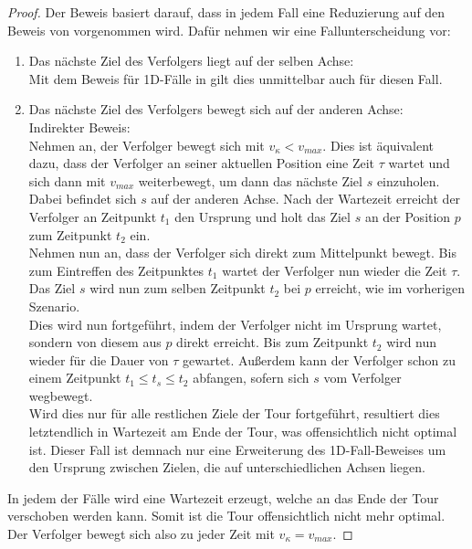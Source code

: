 \documentclass[german,version-2019-11]{uzl-thesis}
\begin{document}
\begin{proof}
Der Beweis basiert darauf, dass in jedem Fall eine Reduzierung auf den Beweis von \cite{helvig} vorgenommen wird. Dafür nehmen wir eine Fallunterscheidung vor:
\begin{enumerate}
\item Das nächste Ziel des Verfolgers liegt auf der selben Achse: \\
Mit dem Beweis für 1D-Fälle in \cite{helvig} gilt dies unmittelbar auch für diesen Fall.

\item Das nächste Ziel des Verfolgers bewegt sich auf der anderen Achse: \\
Indirekter Beweis: \\
Nehmen an, der Verfolger bewegt sich mit $v_{\kappa} < v_{max}$. Dies ist äquivalent dazu, dass der Verfolger an seiner aktuellen Position eine Zeit $\tau$ wartet und sich dann mit $v_{max}$ weiterbewegt, um dann das nächste Ziel $s$ einzuholen. Dabei befindet sich $s$ auf der anderen Achse. Nach der Wartezeit erreicht der Verfolger an Zeitpunkt $t_1$ den Ursprung und holt das Ziel $s$ an der Position $p$ zum Zeitpunkt $t_2$ ein. \\
Nehmen nun an, dass der Verfolger sich direkt zum Mittelpunkt bewegt. Bis zum Eintreffen des Zeitpunktes $t_1$ wartet der Verfolger nun wieder die Zeit $\tau$. Das Ziel $s$ wird nun zum selben Zeitpunkt $t_2$ bei $p$ erreicht, wie im vorherigen Szenario. \\
Dies wird nun fortgeführt, indem der Verfolger nicht im Ursprung wartet, sondern von diesem aus $p$ direkt erreicht. Bis zum Zeitpunkt $t_2$ wird nun wieder für die Dauer von $\tau$ gewartet. Außerdem kann der Verfolger schon zu einem Zeitpunkt $t_1 \leq t_{s} \leq t_2$ abfangen, sofern sich $s$ vom Verfolger wegbewegt. \\
Wird dies nur für alle restlichen Ziele der Tour fortgeführt, resultiert dies letztendlich in Wartezeit am Ende der Tour, was offensichtlich nicht optimal ist. Dieser Fall ist demnach nur eine Erweiterung des 1D-Fall-Beweises um den Ursprung zwischen Zielen, die auf unterschiedlichen Achsen liegen. 
\end{enumerate}

In jedem der Fälle wird eine Wartezeit erzeugt, welche an das Ende der Tour \\verschoben werden kann. Somit ist die Tour offensichtlich nicht mehr optimal. Der Verfolger bewegt sich also zu jeder Zeit mit $v_{\kappa} = v_{max}$.
\end{proof}
\end{document}
